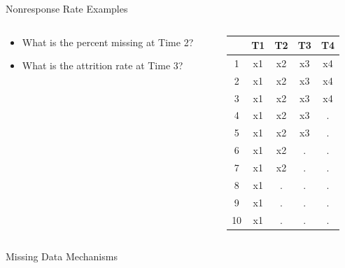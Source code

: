 \documentclass{beamer}\usepackage[]{graphicx}\usepackage[]{color}
\begin{document}
\begin{frame}{Nonresponse Rate Examples}
  
  \begin{columns}
    \begin{column}{0.5\textwidth}
      
      \begin{itemize}
        \item What is the percent missing at Time 2?
          \vc
        \item What is the attrition rate at Time 3?
      \end{itemize}
      
    \end{column}
    \begin{column}{0.5\textwidth}
      
\begin{table}[ht]
\centering
\begin{tabular}{ccccc}
  \toprule
 & T1 & T2 & T3 & T4 \\ 
  \midrule
1 & x1 & x2 & x3 & x4 \\ 
  2 & x1 & x2 & x3 & x4 \\ 
  3 & x1 & x2 & x3 & x4 \\ 
  4 & x1 & x2 & x3 & . \\ 
  5 & x1 & x2 & x3 & . \\ 
  6 & x1 & x2 & . & . \\ 
  7 & x1 & x2 & . & . \\ 
  8 & x1 & . & . & . \\ 
  9 & x1 & . & . & . \\ 
  10 & x1 & . & . & . \\ 
   \bottomrule
\end{tabular}
\end{table}


\end{column}
\end{columns}

\end{frame}

\watermarkon %

\begin{frame}
  
  \begin{center}
    \huge{Missing Data Mechanisms}
  \end{center}
  
\end{frame}
\end{document}
